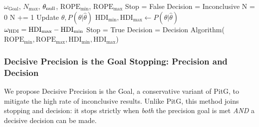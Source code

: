 \begin{algorithm}
    \caption{Precision is the Goal (highlighted: the stopping condition)}\label{alg:pitg}
    \begin{algorithmic}
    \Require $\omega_\mathrm{Goal}$, $N_\mathrm{max}$, $\theta_{\rm null}$, $\mathrm{ROPE}_\mathrm{min}$, $\mathrm{ROPE}_\mathrm{max}$
    \State Stop = False
    \State Decision = Inconclusive
    \State N = 0
    \State N += 1 
    \State Update $\hat\theta, P(\theta|\hat\theta)$ 
    \State $\mathrm{HDI}_\mathrm{min}, \mathrm{HDI}_\mathrm{max} \gets P(\theta|\hat\theta)$
    \State $\omega_{\rm HDI} = \mathrm{HDI}_\mathrm{max} - \mathrm{HDI}_\mathrm{min}$
         \State \HiLi Stop = True 
         \State Decision = Decision Algorithm($\mathrm{ROPE}_\mathrm{min}, \mathrm{ROPE}_\mathrm{max}, \mathrm{HDI}_\mathrm{min}, \mathrm{HDI}_\mathrm{max}$)  
    \EndIf
    \EndWhile
    \end{algorithmic}
\end{algorithm}

\subsubsection{Decisive Precision is the Goal Stopping: Precision and Decision}\label{sec:decisive_pitg}

We propose Decisive Precision is the Goal, a conservative variant of PitG,
to mitigate the high rate of inconclusive results. Unlike PitG, this method joins stopping
and decision: it stops strictly when \textit{both} the precision goal is met \textit{AND}
a decisive decision can be made.


